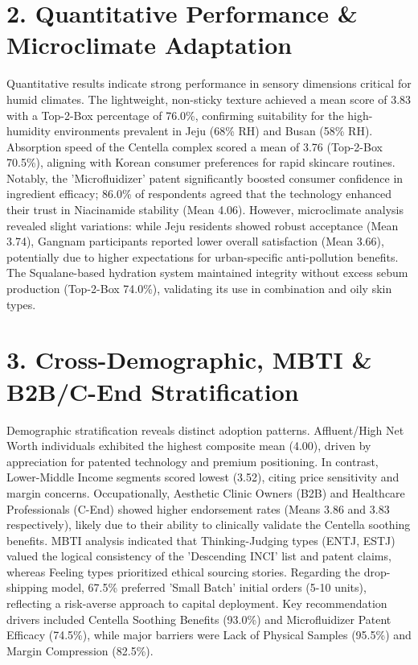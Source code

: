 \documentclass[10pt,twocolumn,a4paper]{article}
\begin{document}
\section{2. Quantitative Performance \& Microclimate Adaptation}
Quantitative results indicate strong performance in sensory dimensions critical for humid climates. The lightweight, non-sticky texture achieved a mean score of 3.83 with a Top-2-Box percentage of 76.0\%, confirming suitability for the high-humidity environments prevalent in Jeju (68\% RH) and Busan (58\% RH). Absorption speed of the Centella complex scored a mean of 3.76 (Top-2-Box 70.5\%), aligning with Korean consumer preferences for rapid skincare routines. Notably, the 'Microfluidizer' patent significantly boosted consumer confidence in ingredient efficacy; 86.0\% of respondents agreed that the technology enhanced their trust in Niacinamide stability (Mean 4.06). However, microclimate analysis revealed slight variations: while Jeju residents showed robust acceptance (Mean 3.74), Gangnam participants reported lower overall satisfaction (Mean 3.66), potentially due to higher expectations for urban-specific anti-pollution benefits. The Squalane-based hydration system maintained integrity without excess sebum production (Top-2-Box 74.0\%), validating its use in combination and oily skin types.
\section{3. Cross-Demographic, MBTI \& B2B/C-End Stratification}
Demographic stratification reveals distinct adoption patterns. Affluent/High Net Worth individuals exhibited the highest composite mean (4.00), driven by appreciation for patented technology and premium positioning. In contrast, Lower-Middle Income segments scored lowest (3.52), citing price sensitivity and margin concerns. Occupationally, Aesthetic Clinic Owners (B2B) and Healthcare Professionals (C-End) showed higher endorsement rates (Means 3.86 and 3.83 respectively), likely due to their ability to clinically validate the Centella soothing benefits. MBTI analysis indicated that Thinking-Judging types (ENTJ, ESTJ) valued the logical consistency of the 'Descending INCI' list and patent claims, whereas Feeling types prioritized ethical sourcing stories. Regarding the drop-shipping model, 67.5\% preferred 'Small Batch' initial orders (5-10 units), reflecting a risk-averse approach to capital deployment. Key recommendation drivers included Centella Soothing Benefits (93.0\%) and Microfluidizer Patent Efficacy (74.5\%), while major barriers were Lack of Physical Samples (95.5\%) and Margin Compression (82.5\%).
\end{document}
